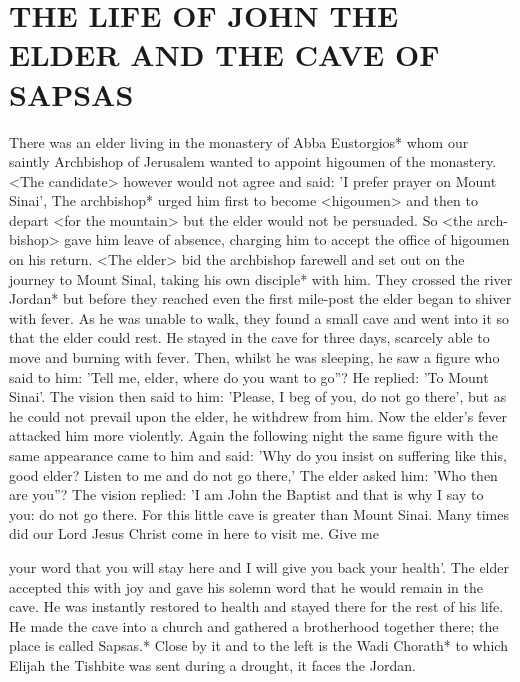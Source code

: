 \chapter{THE LIFE OF JOHN THE ELDER AND THE CAVE OF SAPSAS}

There was an elder living in the monastery of Abba Eustorgios*
whom our saintly Archbishop of Jerusalem wanted to appoint
higoumen of the monastery. <The candidate> however would not
agree and said: 'I prefer prayer on Mount Sinai', The archbishop*
urged him first to become <higoumen> and then to depart <for the
mountain> but the elder would not be persuaded. So <the arch-
bishop> gave him leave of absence, charging him to accept the
office of higoumen on his return. <The elder> bid the archbishop
farewell and set out on the journey to Mount Sinal, taking his own
disciple* with him. They crossed the river Jordan* but before they
reached even the first mile-post the elder began to shiver with fever.
As he was unable to walk, they found a small cave and went into
it so that the elder could rest. He stayed in the cave for three days,
scarcely able to move and burning with fever. Then, whilst he was
sleeping, he saw a figure who said to him: 'Tell me, elder, where do
you want to go”? He replied: 'To Mount Sinai'. The vision then said
to him: 'Please, I beg of you, do not go there', but as he could not
prevail upon the elder, he withdrew from him. Now the elder's fever
attacked him more violently. Again the following night the same
figure with the same appearance came to him and said: 'Why do
you insist on suffering like this, good elder? Listen to me and do not
go there,' The elder asked him: 'Who then are you”? The vision
replied: 'I am John the Baptist and that is why I say to you: do not
go there. For this little cave is greater than Mount Sinai. Many
times did our Lord Jesus Christ come in here to visit me. Give me

your word that you will stay here and I will give you back your
health'. The elder accepted this with joy and gave his solemn word
that he would remain in the cave. He was instantly restored to
health and stayed there for the rest of his life. He made the cave
into a church and gathered a brotherhood together there; the place
is called Sapsas.* Close by it and to the left is the Wadi Chorath*
to which Elijah the Tishbite was sent during a drought, it faces the
Jordan.

